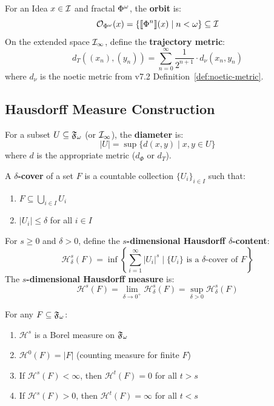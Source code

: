 \begin{definition}
\label{def:orbit-space-metric}
For an Idea $x \in \mathcal{I}$ and fractal $\Phi^{\omega}$, the \textbf{orbit} is:
\[
\mathcal{O}_{\Phi^{\omega}}(x) = \{\llbracket \Phi^{n} \rrbracket(x) \mid n < \omega\} \subseteq \mathcal{I}
\]
On the extended space $\mathcal{I}_\infty$, define the \textbf{trajectory metric}:
\[
d_T((x_n), (y_n)) = \sum_{n=0}^\infty \frac{1}{2^{n+1}} \cdot d_\nu(x_n, y_n)
\]
where $d_\nu$ is the noetic metric from v7.2 Definition~\ref*{def:noetic-metric}.
\end{definition}

\subsection{Hausdorff Measure Construction}

\begin{definition}[Diameter]
\label{def:diameter}
For a subset $U \subseteq \mathfrak{F}_\omega$ (or $\mathcal{I}_\infty$), the \textbf{diameter} is:
\[
|U| = \sup\{d(x, y) \mid x, y \in U\}
\]
where $d$ is the appropriate metric ($d_\Phi$ or $d_T$).
\end{definition}

\begin{definition}
\label{def:delta-cover}
A \textbf{$\delta$-cover} of a set $F$ is a countable collection $\{U_i\}_{i \in I}$ such that:
\begin{enumerate}[label=(\roman*)]
  \item $F \subseteq \bigcup_{i \in I} U_i$
  \item $|U_i| \leq \delta$ for all $i \in I$
\end{enumerate}
\end{definition}

\begin{definition}
\label{def:hausdorff-measure}
For $s \geq 0$ and $\delta > 0$, define the \textbf{$s$-dimensional Hausdorff $\delta$-content}:
\[
\mathcal{H}^s_\delta(F) = \inf\left\{\sum_{i=1}^\infty |U_i|^s \;\Big|\; \{U_i\} \text{ is a } \delta\text{-cover of } F\right\}
\]
The \textbf{$s$-dimensional Hausdorff measure} is:
\[
\mathcal{H}^s(F) = \lim_{\delta \to 0^+} \mathcal{H}^s_\delta(F) = \sup_{\delta > 0} \mathcal{H}^s_\delta(F)
\]
\end{definition}

\begin{proposition}
\label{prop:hausdorff-props}
For any $F \subseteq \mathfrak{F}_\omega$:
\begin{enumerate}[label=(\roman*)]
  \item $\mathcal{H}^s$ is a Borel measure on $\mathfrak{F}_\omega$
  \item $\mathcal{H}^0(F) = |F|$ (counting measure for finite $F$)
  \item If $\mathcal{H}^s(F) < \infty$, then $\mathcal{H}^t(F) = 0$ for all $t > s$
  \item If $\mathcal{H}^s(F) > 0$, then $\mathcal{H}^t(F) = \infty$ for all $t < s$
\end{enumerate}
\end{proposition}

